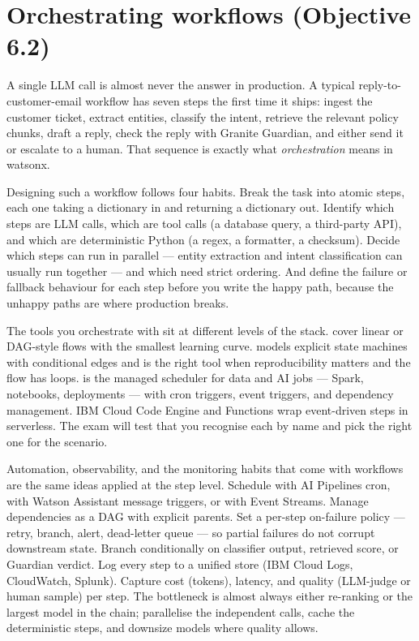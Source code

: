 \section{Orchestrating workflows (Objective 6.2)}

A single LLM call is almost never the answer in production. A typical reply-to-customer-email workflow has seven steps the first time it ships: ingest the customer ticket, extract entities, classify the intent, retrieve the relevant policy chunks, draft a reply, check the reply with Granite Guardian, and either send it or escalate to a human. That sequence is exactly what \emph{orchestration} means in watsonx.

Designing such a workflow follows four habits. Break the task into atomic steps, each one taking a dictionary in and returning a dictionary out. Identify which steps are LLM calls, which are tool calls (a database query, a third-party API), and which are deterministic Python (a regex, a formatter, a checksum). Decide which steps can run in parallel --- entity extraction and intent classification can usually run together --- and which need strict ordering. And define the failure or fallback behaviour for each step before you write the happy path, because the unhappy paths are where production breaks.

The tools you orchestrate with sit at different levels of the stack.  cover linear or DAG-style flows with the smallest learning curve.  models explicit state machines with conditional edges and is the right tool when reproducibility matters and the flow has loops.  is the managed scheduler for data and AI jobs --- Spark, notebooks, deployments --- with cron triggers, event triggers, and dependency management. IBM Cloud Code Engine and Functions wrap event-driven steps in serverless. The exam will test that you recognise each by name and pick the right one for the scenario.

Automation, observability, and the monitoring habits that come with workflows are the same ideas applied at the step level. Schedule with AI Pipelines cron, with Watson Assistant message triggers, or with Event Streams. Manage dependencies as a DAG with explicit parents. Set a per-step on-failure policy --- retry, branch, alert, dead-letter queue --- so partial failures do not corrupt downstream state. Branch conditionally on classifier output, retrieved score, or Guardian verdict. Log every step to a unified store (IBM Cloud Logs, CloudWatch, Splunk). Capture cost (tokens), latency, and quality (LLM-judge or human sample) per step. The bottleneck is almost always either re-ranking or the largest model in the chain; parallelise the independent calls, cache the deterministic steps, and downsize models where quality allows.

